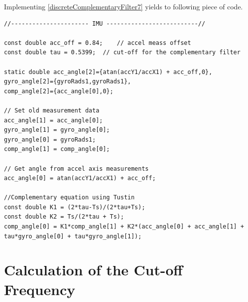 Implementing \eqref{discreteComplementaryFilter7} yields to following piece of code. 
%

\begin{lstlisting}[caption  = {Code for the implementation of the complementary filter in C\texttt{++}},
label    = codeCompFilter ]
//---------------------- IMU --------------------------//

const double acc_off = 0.84;  	// accel meass offset
const double tau = 0.5399;	// cut-off for the complementary filter

static double acc_angle[2]={atan(accY1/accX1) + acc_off,0},
gyro_angle[2]={gyroRads1,gyroRads1},
comp_angle[2]={acc_angle[0],0};

// Set old measurement data
acc_angle[1] = acc_angle[0];
gyro_angle[1] = gyro_angle[0];
gyro_angle[0] = gyroRads1;
comp_angle[1] = comp_angle[0];

// Get angle from accel axis measurements
acc_angle[0] = atan(accY1/accX1) + acc_off;

//Complementary equation using Tustin
const double K1 = (2*tau-Ts)/(2*tau+Ts);
const double K2 = Ts/(2*tau + Ts);
comp_angle[0] = K1*comp_angle[1] + K2*(acc_angle[0] + acc_angle[1] + tau*gyro_angle[0] + tau*gyro_angle[1]);
\end{lstlisting}

\section{Calculation of the Cut-off Frequency}


